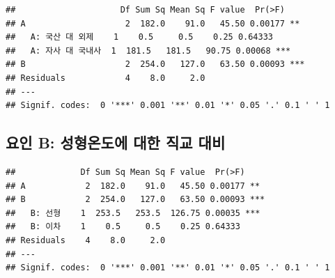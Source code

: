 \documentclass[
]{book}
\newenvironment{Shaded}{\begin{snugshade}}{\end{snugshade}}
\newcommand{\AttributeTok}[1]{\textcolor[rgb]{0.77,0.63,0.00}{#1}}
\newcommand{\CommentTok}[1]{\textcolor[rgb]{0.56,0.35,0.01}{\textit{#1}}}
\newcommand{\DecValTok}[1]{\textcolor[rgb]{0.00,0.00,0.81}{#1}}
\newcommand{\FunctionTok}[1]{\textcolor[rgb]{0.00,0.00,0.00}{#1}}
\newcommand{\NormalTok}[1]{#1}
\newcommand{\OtherTok}[1]{\textcolor[rgb]{0.56,0.35,0.01}{#1}}
\newcommand{\SpecialCharTok}[1]{\textcolor[rgb]{0.00,0.00,0.00}{#1}}
\newcommand{\StringTok}[1]{\textcolor[rgb]{0.31,0.60,0.02}{#1}}
\begin{document}
\begin{verbatim}
##                     Df Sum Sq Mean Sq F value  Pr(>F)    
## A                    2  182.0    91.0   45.50 0.00177 ** 
##   A: 국산 대 외제    1    0.5     0.5    0.25 0.64333    
##   A: 자사 대 국내사  1  181.5   181.5   90.75 0.00068 ***
## B                    2  254.0   127.0   63.50 0.00093 ***
## Residuals            4    8.0     2.0                    
## ---
## Signif. codes:  0 '***' 0.001 '**' 0.01 '*' 0.05 '.' 0.1 ' ' 1
\end{verbatim}

\hypertarget{uxc694uxc778-b-uxc131uxd615uxc628uxb3c4uxc5d0-uxb300uxd55c-uxc9c1uxad50-uxb300uxbe44}{%
\subsection{요인 B: 성형온도에 대한 직교 대비}\label{uxc694uxc778-b-uxc131uxd615uxc628uxb3c4uxc5d0-uxb300uxd55c-uxc9c1uxad50-uxb300uxbe44}}

\begin{Shaded}
\end{Shaded}

\begin{verbatim}
##             Df Sum Sq Mean Sq F value  Pr(>F)    
## A            2  182.0    91.0   45.50 0.00177 ** 
## B            2  254.0   127.0   63.50 0.00093 ***
##   B: 선형    1  253.5   253.5  126.75 0.00035 ***
##   B: 이차    1    0.5     0.5    0.25 0.64333    
## Residuals    4    8.0     2.0                    
## ---
## Signif. codes:  0 '***' 0.001 '**' 0.01 '*' 0.05 '.' 0.1 ' ' 1
\end{verbatim}
\end{document}
